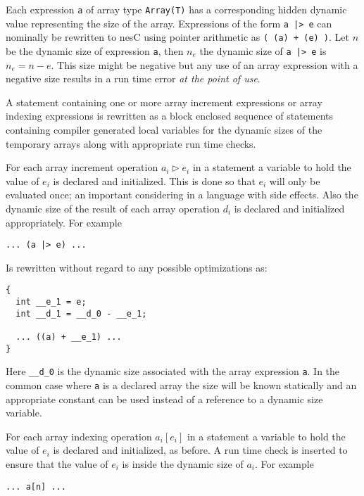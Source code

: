 Each expression \texttt{a} of array type \texttt{Array(T)} has a corresponding hidden dynamic
value representing the size of the array. Expressions of the form \texttt{a |> e} can nominally
be rewritten to nesC using pointer arithmetic as \texttt{( (a) + (e) )}. Let $n$ be the dynamic
size of expression \texttt{a}, then $n_e$ the dynamic size of \texttt{a |> e} is $n_e = n - e$.
This size might be negative but any use of an array expression with a negative size results in a
run time error \emph{at the point of use}.

A statement containing one or more array increment expressions or array indexing expressions is
rewritten as a block enclosed sequence of statements containing compiler generated local
variables for the dynamic sizes of the temporary arrays along with appropriate run time checks.

For each array increment operation $a_i \rhd e_i$ in a statement a variable to hold the value of
$e_i$ is declared and initialized. This is done so that $e_i$ will only be evaluated once; an
important considering in a language with side effects. Also the dynamic size of the result of
each array operation $d_i$ is declared and initialized appropriately. For example

\singlespace
\begin{lstlisting}[language=nesC]
... (a |> e) ...
\end{lstlisting}
\primaryspacing

Is rewritten without regard to any possible optimizations as:

\singlespace
\begin{lstlisting}[language=nesC]
{
  int __e_1 = e;
  int __d_1 = __d_0 - __e_1;

  ... ((a) + __e_1) ...
}
\end{lstlisting}
\primaryspacing

Here \texttt{\_\_d\_0} is the dynamic size associated with the array expression \texttt{a}. In
the common case where \texttt{a} is a declared array the size will be known statically and an
appropriate constant can be used instead of a reference to a dynamic size variable.

For each array indexing operation $a_i[e_i]$ in a statement a variable to hold the value of
$e_i$ is declared and initialized, as before. A run time check is inserted to ensure that
the value of $e_i$ is inside the dynamic size of $a_i$. For example

\singlespace
\begin{lstlisting}[language=nesC]
... a[n] ...
\end{lstlisting}
\primaryspacing


